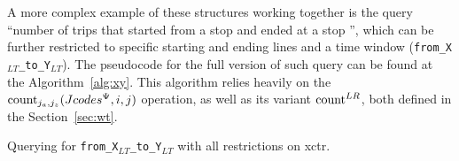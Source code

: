     A more complex example of these structures working together is the query ``number of trips that started from a stop  and ended at a stop '', which can be further restricted to specific starting and ending lines and a time window (\texttt{from\_X$_{LT}$\_to\_Y$_{LT}$}). The pseudocode for the full version of such query can be found at the Algorithm~\ref{alg:xy}. This algorithm relies heavily on the $\operatorname{count}_{j_a,j_z}(Jcodes^{\Psi},i,j)$ operation, as well as its variant $\operatorname{count}^{LR}$, both defined in the Section~\ref{sec:wt}.
    
    \begin{algorithm}[h!]
     
     
     \caption{Querying for \texttt{from\_X$_{LT}$\_to\_Y$_{LT}$} with all restrictions on \acrshort{xctr}.}
     \label{alg:xy}
    \end{algorithm}
    
